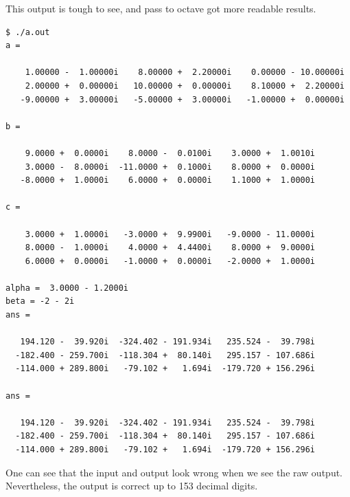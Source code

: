 \documentclass[12pt]{article}
\begin{document}
This output is tough to see, and pass to octave got more readable results.
{\footnotesize
\begin{verbatim}
$ ./a.out
a =

    1.00000 -  1.00000i    8.00000 +  2.20000i    0.00000 - 10.00000i
    2.00000 +  0.00000i   10.00000 +  0.00000i    8.10000 +  2.20000i
   -9.00000 +  3.00000i   -5.00000 +  3.00000i   -1.00000 +  0.00000i

b =

    9.0000 +  0.0000i    8.0000 -  0.0100i    3.0000 +  1.0010i
    3.0000 -  8.0000i  -11.0000 +  0.1000i    8.0000 +  0.0000i
   -8.0000 +  1.0000i    6.0000 +  0.0000i    1.1000 +  1.0000i

c =

    3.0000 +  1.0000i   -3.0000 +  9.9900i   -9.0000 - 11.0000i
    8.0000 -  1.0000i    4.0000 +  4.4400i    8.0000 +  9.0000i
    6.0000 +  0.0000i   -1.0000 +  0.0000i   -2.0000 +  1.0000i

alpha =  3.0000 - 1.2000i
beta = -2 - 2i
ans =

   194.120 -  39.920i  -324.402 - 191.934i   235.524 -  39.798i
  -182.400 - 259.700i  -118.304 +  80.140i   295.157 - 107.686i
  -114.000 + 289.800i   -79.102 +   1.694i  -179.720 + 156.296i

ans =

   194.120 -  39.920i  -324.402 - 191.934i   235.524 -  39.798i
  -182.400 - 259.700i  -118.304 +  80.140i   295.157 - 107.686i
  -114.000 + 289.800i   -79.102 +   1.694i  -179.720 + 156.296i

\end{verbatim}
}
One can see that the input and output look wrong when we see the raw output. Nevertheless, the output is correct up to 153 decimal digits.
\end{document}
